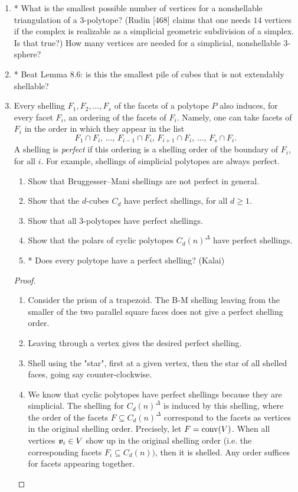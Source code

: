 \documentclass{article}
\begin{document}
\begin{enumerate}
\item * What is the smallest possible number of vertices for a nonshellable triangulation of a $3$-polytope?
(Rudin [468] claims that one needs $14$ vertices if the complex is realizable as a simplicial geometric subdivision of a simplex. Is that true?)
How many vertices are needed for a simplicial, nonshellable $3$-sphere?

\item * Beat Lemma 8.6: is this the smallest pile of cubes that is not extendably shellable?

\item Every shelling $F_1,F_2,\ldots,F_s$ of the facets of a polytope $P$ also induces, for every facet $F_i$, an ordering of the facets of $F_i$. Namely, one can take facets of $F_i$ in the order in which they appear in the list
\[
F_1 \cap F_i,\, \ldots,\, F_{i-1}\cap F_i,\, F_{i+1}\cap F_i,\, \ldots,\, F_s \cap F_i.
\]
A shelling is \emph{perfect} if this ordering is a shelling order of the boundary of $F_i$, for all $i$. For example, shellings of simplicial polytopes are always perfect.
\begin{enumerate}[label=(\roman*)]
\item Show that Bruggesser--Mani shellings are not perfect in general.
\item Show that the $d$-cubes $C_d$ have perfect shellings, for all $d \ge 1$.
\item Show that all $3$-polytopes have perfect shellings.
\item Show that the polars of cyclic polytopes $C_d(n)^{\Delta}$ have perfect shellings.
\item * Does every polytope have a perfect shelling? (Kalai)
\end{enumerate}

\begin{proof}
\begin{enumerate}[label=(\roman*)]
\item Consider the prism of a trapezoid. The B-M shelling leaving from the smaller of the two parallel square faces does not give a perfect shelling order.

\item Leaving through a vertex gives the desired perfect shelling.

\item Shell using the "star", first at a given vertex, then the star of all shelled faces, going say counter-clockwise.

\item We know that cyclic polytopes have perfect shellings because they are simplicial. The shelling for $C_d(n)^\Delta$ is induced by this shelling, where the order of the facets $F \subseteq C_d(n)^\Delta$ correspond to the facets as vertices in the original shelling order. Precisely, let $F = \operatorname{conv}(V)$. When all vertices $\textbf{\textit{v}}_i \in V$ show up in the original shelling order (i.e. the corresponding facets $F_i \subseteq C_d(n))$, then it is shelled. Any order suffices for facets appearing together. 


\end{enumerate}
\end{proof}
\end{enumerate}
\end{document}
